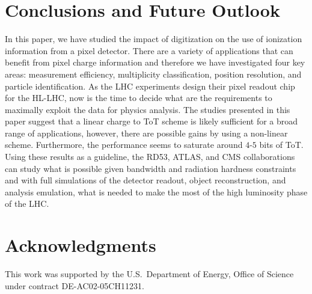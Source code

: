 \documentclass[12pt]{article}
\begin{document}


\section{Conclusions and Future Outlook}
\label{sec:concl}

In this paper, we have studied the impact of digitization on the use of ionization information from a pixel detector.  There are a variety of applications that can benefit from pixel charge information and therefore we have investigated four key areas: measurement efficiency, multiplicity classification, position resolution, and particle identification.  As the LHC experiments design their pixel readout chip for the HL-LHC, now is the time to decide what are the requirements to maximally exploit the data for physics analysis.  The studies presented in this paper suggest that a linear charge to ToT scheme is likely sufficient for a broad range of applications, however, there are possible gains by using a non-linear scheme.  Furthermore,  the performance seems to saturate around $4$-$5$ bits of ToT.  Using these results as a guideline, the RD53, ATLAS, and CMS collaborations can study what is possible given bandwidth and radiation hardness constraints and with full simulations of the detector readout, object reconstruction, and analysis emulation, what is needed to make the most of the high luminosity phase of the LHC.

\section{Acknowledgments}

This work was supported by the U.S.~Department of Energy, Office of Science under contract DE-AC02-05CH11231.

\clearpage

\appendix
\end{document}
